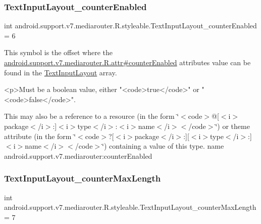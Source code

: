 \subsubsection{\texorpdfstring{Text\+Input\+Layout\+\_\+counter\+Enabled}{TextInputLayout\_counterEnabled}}
{\footnotesize\ttfamily int android.\+support.\+v7.\+mediarouter.\+R.\+styleable.\+Text\+Input\+Layout\+\_\+counter\+Enabled = 6\hspace{0.3cm}{\ttfamily [static]}}

This symbol is the offset where the \hyperlink{classandroid_1_1support_1_1v7_1_1mediarouter_1_1R_1_1attr_a27efdede37a68aaeeb31d34c5648e300}{android.\+support.\+v7.\+mediarouter.\+R.\+attr\#counter\+Enabled} attribute\textquotesingle{}s value can be found in the \hyperlink{classandroid_1_1support_1_1v7_1_1mediarouter_1_1R_1_1styleable_a935a5feb3f0394eb1c07f26b207dfb2d}{Text\+Input\+Layout} array.

\begin{DoxyVerb}      <p>Must be a boolean value, either "<code>true</code>" or "<code>false</code>".
\end{DoxyVerb}
 

This may also be a reference to a resource (in the form \char`\"{}$<$code$>$@\mbox{[}$<$i$>$package$<$/i$>$\+:\mbox{]}$<$i$>$type$<$/i$>$\+:$<$i$>$name$<$/i$>$$<$/code$>$\char`\"{}) or theme attribute (in the form \char`\"{}$<$code$>$?\mbox{[}$<$i$>$package$<$/i$>$\+:\mbox{]}\mbox{[}$<$i$>$type$<$/i$>$\+:\mbox{]}$<$i$>$name$<$/i$>$$<$/code$>$\char`\"{}) containing a value of this type.  name android.\+support.\+v7.\+mediarouter\+:counter\+Enabled \mbox{\label{classandroid_1_1support_1_1v7_1_1mediarouter_1_1R_1_1styleable_a930a315bdfd694267732a06661f7e664}} 
\subsubsection{\texorpdfstring{Text\+Input\+Layout\+\_\+counter\+Max\+Length}{TextInputLayout\_counterMaxLength}}
{\footnotesize\ttfamily int android.\+support.\+v7.\+mediarouter.\+R.\+styleable.\+Text\+Input\+Layout\+\_\+counter\+Max\+Length = 7\hspace{0.3cm}{\ttfamily [static]}}

